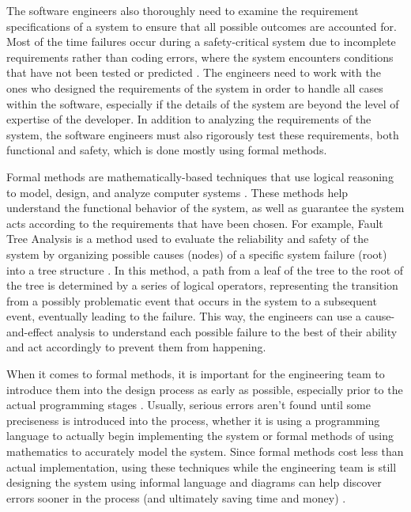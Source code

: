 \documentclass[12pt]{article}
\begin{document}
  The software engineers also thoroughly need to examine the requirement specifications of a system to ensure that all possible outcomes are accounted for. Most of the time failures occur during a safety-critical system due to incomplete requirements rather than coding errors, where the system encounters conditions that have not been tested or predicted \cite{ref2}. The engineers need to work with the ones who designed the requirements of the system in order to handle all cases within the software, especially if the details of the system are beyond the level of expertise of the developer. In addition to analyzing the requirements of the system, the software engineers must also rigorously test these requirements, both functional and safety, which is done mostly using formal methods.

  Formal methods are mathematically-based techniques that use logical reasoning to model, design, and analyze computer systems \cite{ref3}. These methods help understand the functional behavior of the system, as well as guarantee the system acts according to the requirements that have been chosen. For example, Fault Tree Analysis is a method used to evaluate the reliability and safety of the system by organizing possible causes (nodes) of a specific system failure (root) into a tree structure \cite{ref3}. In this method, a path from a leaf of the tree to the root of the tree is determined by a series of logical operators, representing the transition from a possibly problematic event that occurs in the system to a subsequent event, eventually leading to the failure. This way, the engineers can use a cause-and-effect analysis to understand each possible failure to the best of their ability and act accordingly to prevent them from happening.

  When it comes to formal methods, it is important for the engineering team to introduce them into the design process as early as possible, especially prior to the actual programming stages \cite{ref1}. Usually, serious errors aren't found until some preciseness is introduced into the process, whether it is using a programming language to actually begin implementing the system or formal methods of using mathematics to accurately model the system. Since formal methods cost less than actual implementation, using these techniques while the engineering team is still designing the system using informal language and diagrams can help discover errors sooner in the process (and ultimately saving time and money) \cite{ref1}. 
\end{document}
